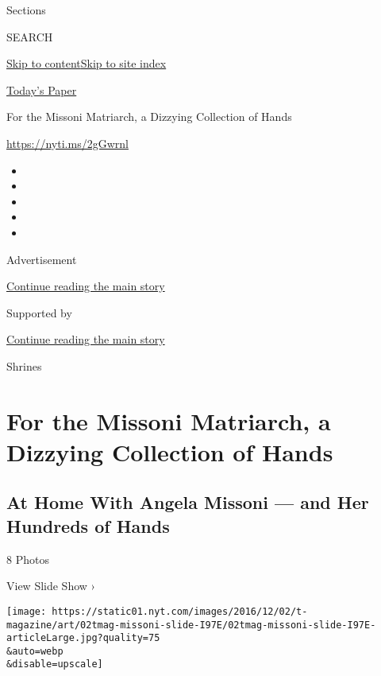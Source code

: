 Sections

SEARCH

\protect\hyperlink{site-content}{Skip to
content}\protect\hyperlink{site-index}{Skip to site index}

\href{https://myaccount.nytimes.com/auth/login?response_type=cookie\&client_id=vi}{}

\href{https://www.nytimes.com/section/todayspaper}{Today's Paper}

For the Missoni Matriarch, a Dizzying Collection of Hands

\href{https://nyti.ms/2gGwrnl}{https://nyti.ms/2gGwrnl}

\begin{itemize}
\item
\item
\item
\item
\item
\end{itemize}

Advertisement

\protect\hyperlink{after-top}{Continue reading the main story}

Supported by

\protect\hyperlink{after-sponsor}{Continue reading the main story}

Shrines

\hypertarget{for-the-missoni-matriarch-a-dizzying-collection-of-hands}{%
\section{For the Missoni Matriarch, a Dizzying Collection of
Hands}\label{for-the-missoni-matriarch-a-dizzying-collection-of-hands}}

\href{https://www.nytimes.com/slideshow/2016/12/05/t-magazine/art/at-home-with-angela-missoni-and-her-hundreds-of-hands.html}{}

\hypertarget{at-home-with-angela-missoni--and-her-hundreds-of-hands}{%
\subsection{At Home With Angela Missoni --- and Her Hundreds of
Hands}\label{at-home-with-angela-missoni--and-her-hundreds-of-hands}}

8 Photos

View Slide Show ›

\texttt{[image: https://static01.nyt.com/images/2016/12/02/t-magazine/art/02tmag-missoni-slide-I97E/02tmag-missoni-slide-I97E-articleLarge.jpg?quality=75\\\&auto=webp\\\&disable=upscale]}

